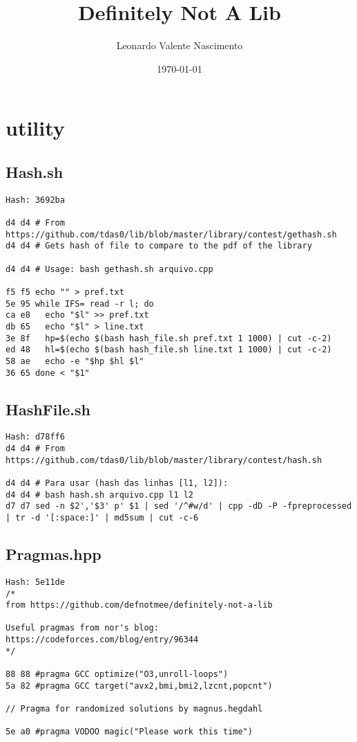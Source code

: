 \documentclass[11pt, a4paper, twoside]{article}
\title{Definitely Not A Lib}
\author{Leonardo Valente Nascimento}
\begin{document}
\twocolumn
\date{\today}
\maketitle


\renewcommand{\contentsname}{Índice} %
\tableofcontents


%
%

\section{utility}

\subsection{Hash.sh}
\begin{lstlisting}
Hash: 3692ba

d4 d4 # From https://github.com/tdas0/lib/blob/master/library/contest/gethash.sh
d4 d4 # Gets hash of file to compare to the pdf of the library

d4 d4 # Usage: bash gethash.sh arquivo.cpp

f5 f5 echo "" > pref.txt
5e 95 while IFS= read -r l; do
ca e8 	echo "$l" >> pref.txt
db 65 	echo "$l" > line.txt
3e 8f 	hp=$(echo $(bash hash_file.sh pref.txt 1 1000) | cut -c-2)
ed 48 	hl=$(echo $(bash hash_file.sh line.txt 1 1000) | cut -c-2)
58 ae 	echo -e "$hp $hl $l"
36 65 done < "$1"
\end{lstlisting}

\subsection{HashFile.sh}
\begin{lstlisting}
Hash: d78ff6
d4 d4 # From https://github.com/tdas0/lib/blob/master/library/contest/hash.sh

d4 d4 # Para usar (hash das linhas [l1, l2]):
d4 d4 # bash hash.sh arquivo.cpp l1 l2
d7 d7 sed -n $2','$3' p' $1 | sed '/^#w/d' | cpp -dD -P -fpreprocessed | tr -d '[:space:]' | md5sum | cut -c-6
\end{lstlisting}

\subsection{Pragmas.hpp}
\begin{lstlisting}
Hash: 5e11de
/*
from https://github.com/defnotmee/definitely-not-a-lib

Useful pragmas from nor's blog: https://codeforces.com/blog/entry/96344
*/

88 88 #pragma GCC optimize("O3,unroll-loops")
5a 82 #pragma GCC target("avx2,bmi,bmi2,lzcnt,popcnt")

// Pragma for randomized solutions by magnus.hegdahl

5e a0 #pragma VODOO magic("Please work this time")
\end{lstlisting}
\end{document}
